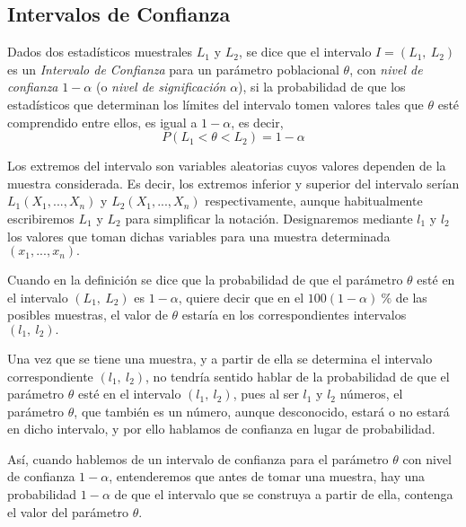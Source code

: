 \subsection{Intervalos de Confianza}
Dados dos estadísticos muestrales $L_1$ y $L_2$, se dice que el intervalo $I=(L_1,\ L_2)$ es un \emph{Intervalo de
Confianza} para un parámetro poblacional $\theta$, con \emph{nivel de confianza} $1-\alpha$ (o \emph{nivel de
significación} $\alpha $), si la probabilidad de que los estadísticos que determinan los límites del intervalo tomen
valores tales que $\theta$ esté comprendido entre ellos, es igual a $1-\alpha$, es decir, \[ P\left( L_{1}<\theta
<L_{2}\right) =1-\alpha \]

Los extremos del intervalo son variables aleatorias cuyos valores dependen de la muestra considerada. Es decir, los
extremos inferior y superior del intervalo serían $L_{1}\left( X_{1},...,X_{n}\right) $ y $L_{2}\left(
X_{1},...,X_{n}\right) $ respectivamente, aunque habitualmente escribiremos $L_{1}$ y $L_{2}$ para simplificar la
notación. Designaremos mediante $l_{1}$ y $l_{2}$ los valores que toman dichas variables para una muestra determinada
$\left( x_{1},...,x_{n}\right).$

Cuando en la definición se dice que la probabilidad de que el parámetro $\theta $ esté en el intervalo $\left( L_{1},\
L_{2}\right) $ es $1-\alpha $, quiere decir que en el $100 \left( 1-\alpha \right) \ \% $ de las posibles muestras, el
valor de $\theta $ estaría en los correspondientes intervalos $\left( l_{1},\ l_{2}\right) .$

Una vez que se tiene una muestra, y a partir de ella se determina el intervalo correspondiente $\left( l_{1},\
l_{2}\right) $, no tendría sentido hablar de la probabilidad de que el parámetro $\theta $ esté en el intervalo $\left(
l_{1},\ l_{2}\right) $, pues al ser $l_{1}$ y $l_{2}$ números, el parámetro $\theta $, que también es un número, aunque
desconocido, estará o no estará en dicho intervalo, y por ello hablamos de confianza en lugar de probabilidad.

Así, cuando hablemos de un intervalo de confianza para el parámetro $\theta $ con nivel de confianza $1-\alpha $,
entenderemos que antes de tomar una muestra, hay una probabilidad $1-\alpha $ de que el intervalo que se construya a
partir de ella, contenga el valor del parámetro $\theta .$

